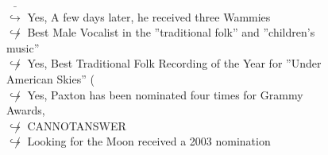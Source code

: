 \documentclass[11pt,a4paper, onecolumn]{article}
\begin{document}
\begin{figure}[t] \small \begin{tcolorbox}[boxsep=0pt,left=5pt,right=0pt,top=2pt,colback = yellow!5] \begin{dialogue}
 \small 
\colorbox{pink!25}{ $\bar{\hookrightarrow}$}
\colorbox{red!25}{Yes,}
{ A few days later, he received three Wammies }
\\
\colorbox{pink!25}{$\not\hookrightarrow$}
{ Best Male Vocalist in the ''traditional folk'' and ''children's music'' }
\\
\colorbox{pink!25}{$\not\hookrightarrow$}
\colorbox{red!25}{Yes,}
{ Best Traditional Folk Recording of the Year for ''Under American Skies'' ( }
\\
\colorbox{pink!25}{$\not\hookrightarrow$}
\colorbox{red!25}{Yes,}
{ Paxton has been nominated four times for Grammy Awards, }
\\
\colorbox{pink!25}{$\not\hookrightarrow$}
{ CANNOTANSWER }
\\
\colorbox{pink!25}{$\not\hookrightarrow$}
{ Looking for the Moon received a 2003 nomination }
\\
 \end{dialogue}\end{tcolorbox}\end{figure}
\end{document}

